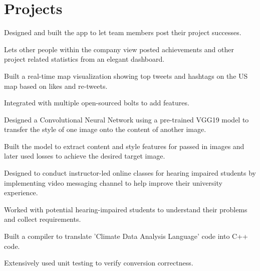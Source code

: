 \documentclass[]{rinkal_resume}
\begin{document}
\begin{minipage}[t]{0.69\textwidth}
\section{Projects}
\begin{tightemize}
\item Designed and built the app to let team members post their project successes.
\item Lets other people within the company view posted achievements and other project related statistics from an elegant dashboard.
\end{tightemize}
\smallsectionsep

\begin{tightemize}
\item Built a real-time map visualization showing top tweets and hashtags on the US map based on likes and re-tweets.
\item Integrated with multiple open-sourced bolts to add features.
\end{tightemize}
\smallsectionsep

\begin{tightemize}
\item Designed a Convolutional Neural Network using a pre-trained VGG19 model to transfer the style of one image onto the content of another image.
\item Built the model to extract content and style features for passed in images and later used losses to achieve the desired target image.
\end{tightemize}
\smallsectionsep

\begin{tightemize}
\item Designed to conduct instructor-led online classes for hearing impaired students by implementing video messaging channel to help improve their university experience.
\item Worked with potential hearing-impaired students to understand their problems and collect requirements.
\end{tightemize}
\smallsectionsep

\begin{tightemize}
\item  Built a compiler to translate 'Climate Data Analysis Language' code into C++ code.
\item Extensively used unit testing to verify conversion correctness.
\end{tightemize}
\smallsectionsep

\end{minipage} 
\end{document}
